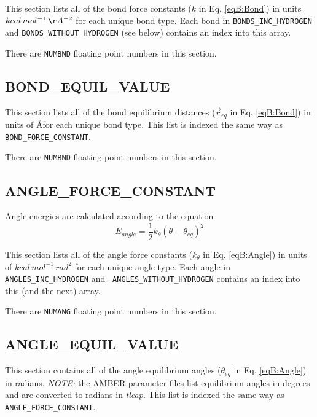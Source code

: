 This section lists all of the bond force constants ($k$ in Eq. \ref{eqB:Bond})
in units $kcal\, mol^{-1}\, \AA^{-2}$ for each unique bond type. Each bond in
{\tt BONDS\_INC\_HYDROGEN} and {\tt BONDS\_WITHOUT\_HYDROGEN} (see below)
contains an index into this array.


\noindent There are {\tt NUMBND} floating point numbers in this section.

\subsection*{BOND\_EQUIL\_VALUE}

This section lists all of the bond equilibrium distances ($\vec{r}_{eq}$ in Eq.
\ref{eqB:Bond}) in units of \AA for each unique bond type. This list is indexed
the same way as {\tt BOND\_FORCE\_CONSTANT}.


\noindent There are {\tt NUMBND} floating point numbers in this section.

\subsection*{ANGLE\_FORCE\_CONSTANT}

Angle energies are calculated according to the equation
\begin{equation}
   E_{angle} = \frac 1 2 k_{\theta} \left ( \theta - \theta _ {eq} \right ) ^ 2
   \label{eqB:Angle}
\end{equation}

This section lists all of the angle force constants ($k_{\theta}$ in Eq.
\ref{eqB:Angle}) in units of $kcal\, mol^{-1}\, rad^2$ for each unique angle
type. Each angle in {\tt ANGLES\_INC\_HYDROGEN} and {\tt
ANGLES\_WITHOUT\_HYDROGEN} contains an index into this (and the next) array.


\noindent There are {\tt NUMANG} floating point numbers in this section.

\subsection*{ANGLE\_EQUIL\_VALUE}

This section contains all of the angle equilibrium angles ($\theta_{eq}$ in Eq.
\ref{eqB:Angle}) in radians.  \emph{NOTE:} the AMBER parameter files list
equilibrium angles in degrees and are converted to radians in \emph{tleap}. This
list is indexed the same way as {\tt ANGLE\_FORCE\_CONSTANT}.

